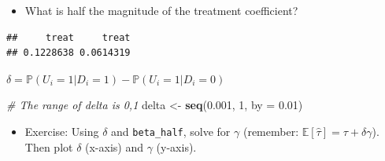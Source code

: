 \documentclass[ignorenonframetext,]{beamer}
\newenvironment{Shaded}{\begin{snugshade}}{\end{snugshade}}
\newcommand{\KeywordTok}[1]{\textcolor[rgb]{0.13,0.29,0.53}{\textbf{#1}}}
\newcommand{\DataTypeTok}[1]{\textcolor[rgb]{0.13,0.29,0.53}{#1}}
\newcommand{\DecValTok}[1]{\textcolor[rgb]{0.00,0.00,0.81}{#1}}
\newcommand{\FloatTok}[1]{\textcolor[rgb]{0.00,0.00,0.81}{#1}}
\newcommand{\StringTok}[1]{\textcolor[rgb]{0.31,0.60,0.02}{#1}}
\newcommand{\CommentTok}[1]{\textcolor[rgb]{0.56,0.35,0.01}{\textit{#1}}}
\newcommand{\OperatorTok}[1]{\textcolor[rgb]{0.81,0.36,0.00}{\textbf{#1}}}
\newcommand{\NormalTok}[1]{#1}
\providecommand{\tightlist}{%
  \setlength{\itemsep}{0pt}\setlength{\parskip}{0pt}}
\begin{document}
\begin{frame}[fragile]{}

\begin{itemize}
\tightlist
\item
  What is half the magnitude of the treatment coefficient?
\end{itemize}

\begin{Shaded}
\end{Shaded}

\begin{verbatim}
##     treat     treat 
## 0.1228638 0.0614319
\end{verbatim}

\(\delta = \mathbb{P}(U_i = 1 | D_i = 1) - \mathbb{P}(U_i = 1 | D_i = 0)\)

\begin{Shaded}
\begin{Highlighting}[]
\CommentTok{# The range of delta is 0,1}
\NormalTok{delta <-}\StringTok{ }\KeywordTok{seq}\NormalTok{(}\FloatTok{0.001}\NormalTok{, }\DecValTok{1}\NormalTok{, }\DataTypeTok{by =} \FloatTok{0.01}\NormalTok{)}
\end{Highlighting}
\end{Shaded}

\begin{itemize}
\tightlist
\item
  Exercise: Using \(\delta\) and \texttt{beta\_half}, solve for
  \(\gamma\) (remember:
  \(\mathbb{E}[\hat{\tau}] = \tau + \delta\gamma\)). Then plot
  \(\delta\) (x-axis) and \(\gamma\) (y-axis).
\end{itemize}

\end{frame}
\end{document}
